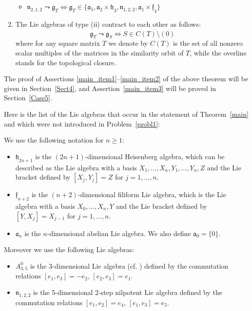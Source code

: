 \documentclass[
reqno]{amsart}
\begin{document}
\begin{theorem}
\begin{enumerate}
\begin{itemize}
\item ${{\mathfrak n}}_{2,1,2} {\leadsto}{{\mathfrak g}}_T 
\Leftrightarrow {{\mathfrak g}}_T\in\{{{\mathfrak a}}_5,{{\mathfrak a}}_2\times {{\mathfrak h}}_3,{{\mathfrak n}}_{1,2,2},{{\mathfrak a}}_1\times{{\mathfrak f}}_4\}$
\end{itemize}
\item\label{main_item3} 
The Lie algebras of type (ii) contract to each other as follows: 
$${\mathfrak g}_T{\leadsto} {\mathfrak g}_S\iff S\in \overline {C(T)\setminus (0)}$$ 
where for any square matrix $T$ 
we denote by $C(T)$ is the set of all nonzero scalar multiples of the matrices in the similarity orbit of $T$, 
while the overline stands for the topological closure. 
\end{enumerate}
\end{theorem}

The proof of Assertions \eqref{main_item1}--\eqref{main_item2} of the above theorem will be given in Section~\ref{Sect4}, 
and Assertion~\eqref{main_item3} will be proved in Section~\ref{Case5}.  

Here is the list of the Lie algebras that occur in the statement of Theorem~\ref{main} 
and which were not introduced in Problem~\ref{probl1}: 

\begin{notation}\label{algebras}
\normalfont
We use the following notation for $n\ge1$: 
\begin{itemize}
\item ${{\mathfrak h}}_{2n+1}$ is the $(2n+1)$-dimensional Heisenberg algebra, 
which can be described as the Lie algebra with a basis $X_1,\dots,X_n,Y_1,\dots,Y_n,Z$ 
and the Lie bracket defined by $[X_j,Y_j]=Z$ for $j=1,\dots,n$. 
\item ${{\mathfrak f}}_{n+2}$ is the $(n+2)$-dimensional filiform Lie algebra, 
which is the Lie algebra with a basis $X_0,\dots,X_n,Y$ and the Lie bracket defined by 
$[Y,X_j]=X_{j-1}$ for $j=1,\dots,n$. 
\item ${{\mathfrak a}}_n$ is the $n$-dimensional abelian Lie algebra. 
We also define ${{\mathfrak a}}_0=\{0\}$.  
\end{itemize}
Moreover we use the following Lie algebras: 
\begin{itemize}
\item  $A_{3,5}^0$ is the 3-dimensional Lie algebra (cf. \cite[\S VI.A]{NP06}) 
defined by the commutation relations 
$[e_1,e_3]=-e_2$, $[e_2,e_3]=e_1$.
\item ${{\mathfrak n}}_{1,2,2}$ is the 5-dimen\-sional 2-step nilpotent Lie algebra 
defined by the commutation relations 
$[e_1,e_2]=e_4$, $[e_1,e_3]=e_5$.
\end{itemize}
\end{notation}
\end{document}
